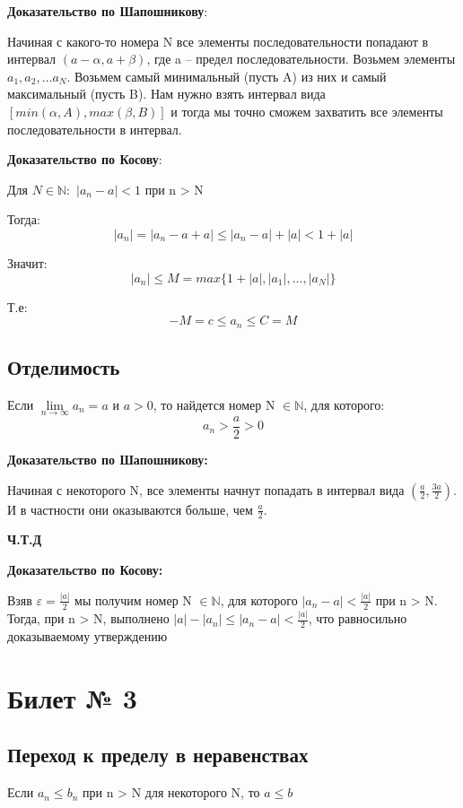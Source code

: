 \documentclass[a4paper,12pt]{article}
\begin{document}
\textbf{Доказательство по Шапошникову}:

Начиная с какого-то номера N все элементы последовательности попадают в интервал $(a-  \alpha, a + \beta )$, где a -- предел последовательности.  Возьмем элементы $a_1, a_2, \ldots a_N$. Возьмем самый минимальный (пусть A) из них и самый максимальный (пусть B). Нам нужно взять интервал вида $[min(\alpha, A), max(\beta, B)]$ и тогда мы точно сможем захватить все элементы последовательности в интервал. 

\textbf{Доказательство по Косову}:

Для $N \in \mathbb{N}: $
$|a_n - a | < 1 $ при n > N

Тогда:
\[
|a_n| = |a_n - a + a| \leq |a_n - a| + |a| < 1 + |a|
\]

Значит:
\[
|a_n| \leq M = max \{1 + |a|, |a_1|, \ldots, |a_N| \}
\]

Т.е:
\[
-M = c \leq a_n \leq C = M
\]
\subsection*{Отделимость}
Если $ \lim\limits_{n \rightarrow \infty} a_n = a$ и $ a > 0 $, то найдется номер N $\in \mathbb{N}$, для которого:
\[
a_n> \frac{a}{2} > 0
\]

\textbf{Доказательство по Шапошникову:}

Начиная с некоторого  N, все элементы начнут попадать в интервал вида $\left(\frac{a}{2},\frac{3a}{2}\right)$.  И в частности они оказываются больше, чем $\frac{a}{2}$.
\begin{center}\textbf{Ч.Т.Д}\end{center}




\textbf{Доказательство по Косову:}

Взяв $ \varepsilon = \frac{|a|}{2} $ мы получим номер N $\in \mathbb{N}$, для которого $
|a_n - a| < \frac{|a|}{2}
$
при n > N. Тогда, при n > N, выполнено $|a| - |a_n| \leq |a_n - a| < \frac{|a|}{2}$, что равносильно доказываемому утверждению
\newpage
\section*{Билет № 3}
\subsection*{Переход к пределу в неравенствах}
Если $a_n \leq b_n$ при n > N для некоторого N, то $a \leq b$
\\
\end{document}
